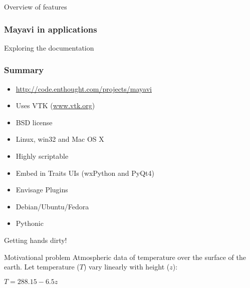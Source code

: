 \documentclass[compress,14pt]{beamer}
\newcounter{time}
\newcommand{\inctime}[1]{\addtocounter{time}{#1}{\vspace*{0.1in}\tiny \thetime\ m}}
\begin{document}
\begin{frame}[fragile]
    {Overview of features}
      \vspace*{-0.3in}
  \begin{center}    
    \hspace*{-0.2in}
  \end{center}    
\end{frame}


\begin{frame}[fragile]
    \frametitle{Mayavi in applications}
      \vspace*{-0.3in}
  \begin{center}    
    \hspace*{0.2in}
  \end{center}
\end{frame}

\begin{frame}
    {Exploring the documentation}
    \begin{center}
    \end{center}
\end{frame}


\begin{frame}
  \frametitle{Summary}
      \begin{itemize}
          \item \url{http://code.enthought.com/projects/mayavi}
          \item Uses VTK (\url{www.vtk.org})
          \item BSD license
          \item Linux, win32 and Mac OS X
          \item Highly scriptable
          \item Embed in Traits UIs (wxPython and PyQt4)
          \item Envisage Plugins
          \item Debian/Ubuntu/Fedora
          \item \alert{Pythonic}
      \end{itemize}
    
      \inctime{10}

\end{frame}

\begin{frame}
    {Getting hands dirty!}

        \begin{block}{Motivational problem}
        Atmospheric data of temperature over the surface of the earth.
        Let temperature ($T$) vary linearly with height ($z$):
        \begin{center}            
        $T = 288.15 - 6.5z$
        \end{center}
        \end{block}
\end{frame}
\end{document}
